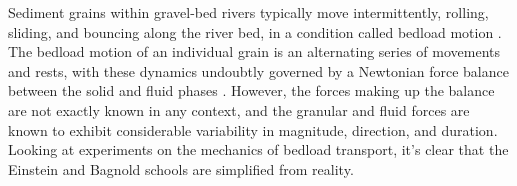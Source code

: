 \documentclass{article}
\begin{document}























Sediment grains within gravel-bed rivers typically move intermittently, rolling, sliding, and bouncing along the river bed, in a condition called bedload motion \citep{Einstein1950, Bagnold1973}.
The bedload motion of an individual grain is an alternating series of movements and rests, with these dynamics undoubtly governed by a Newtonian force balance between the solid and fluid phases \citep{Schmeeckle2013, Ji2013}.
However, the forces making up the balance are not exactly known in any context, and the granular \citep{Lamb2008, Frey2011, Booth2014} and fluid \citep{Schmeeckle2007, Celik2014, Amir2014, Shih2017} forces are known to exhibit considerable variability in magnitude, direction, and duration. 
Looking at experiments on the mechanics of bedload transport, it's clear that the Einstein and Bagnold schools are simplified from reality.
\end{document}
